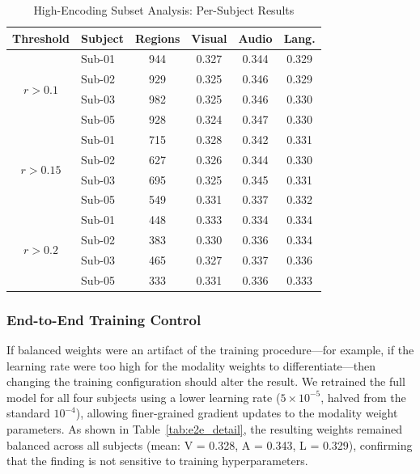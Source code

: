\documentclass[conference]{IEEEtran}
\begin{document}
\begin{table}[t]
\caption{High-Encoding Subset Analysis: Per-Subject Results}
\label{tab:subset_detail}
\centering
\begin{tabular*}{\columnwidth}{@{\extracolsep{\fill}}clcccc@{}}
\toprule
Threshold & Subject & Regions & Visual & Audio & Lang. \\
\midrule
\multirow{4}{*}{$r\!>\!0.1$}
 & Sub-01 & 944 & 0.327 & 0.344 & 0.329 \\
 & Sub-02 & 929 & 0.325 & 0.346 & 0.329 \\
 & Sub-03 & 982 & 0.325 & 0.346 & 0.330 \\
 & Sub-05 & 928 & 0.324 & 0.347 & 0.330 \\
\midrule
\multirow{4}{*}{$r\!>\!0.15$}
 & Sub-01 & 715 & 0.328 & 0.342 & 0.331 \\
 & Sub-02 & 627 & 0.326 & 0.344 & 0.330 \\
 & Sub-03 & 695 & 0.325 & 0.345 & 0.331 \\
 & Sub-05 & 549 & 0.331 & 0.337 & 0.332 \\
\midrule
\multirow{4}{*}{$r\!>\!0.2$}
 & Sub-01 & 448 & 0.333 & 0.334 & 0.334 \\
 & Sub-02 & 383 & 0.330 & 0.336 & 0.334 \\
 & Sub-03 & 465 & 0.327 & 0.337 & 0.336 \\
 & Sub-05 & 333 & 0.331 & 0.336 & 0.333 \\
\bottomrule
\end{tabular*}
\end{table}

\subsubsection{End-to-End Training Control}
If balanced weights were an artifact of the training procedure---for example, if the learning rate were too high for the modality weights to differentiate---then changing the training configuration should alter the result. We retrained the full model for all four subjects using a lower learning rate ($5 \times 10^{-5}$, halved from the standard $10^{-4}$), allowing finer-grained gradient updates to the modality weight parameters. As shown in Table~\ref{tab:e2e_detail}, the resulting weights remained balanced across all subjects (mean: V = 0.328, A = 0.343, L = 0.329), confirming that the finding is not sensitive to training hyperparameters.
\end{document}
